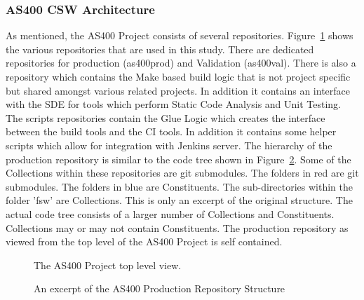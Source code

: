 \documentclass[12pt, a4paper, titlepage]{scrartcl}
\begin{document}
\subsubsection{AS400 CSW Architecture }
As mentioned, the AS400 Project consists of several repositories. Figure~\ref{fig:as400-top-level} shows the various repositories that are used in this study. There are dedicated repositories for production (as400prod) and Validation (as400val). There is also a repository which contains the Make based build logic that is not project specific but shared amongst various related projects. In addition it contains an interface with the SDE for tools which perform Static Code Analysis and Unit Testing. The scripts repositories contain the Glue Logic which creates the interface between the build tools and the CI tools. In addition it contains some helper scripts which allow for integration with Jenkins server. The hierarchy of the production repository is similar to the code tree shown in Figure~\ref{fig:prod-repo-structure}. Some of the Collections within these repositories are git submodules\cite{chacon2011git}. The folders in red are git submodules. The folders in blue are Constituents. The sub-directories within the folder 'fsw' are Collections. This is only an excerpt of the original structure. The actual code tree consists of a larger number of Collections and Constituents. Collections may or may not contain Constituents. The production repository as viewed from the top level of the AS400 Project is self contained.  

\begin{figure}[h]
\noindent{}
\caption{The AS400 Project top level view.}
\label{fig:as400-top-level}
\end{figure}
\begin{figure}
\noindent{}
\caption{An excerpt of the AS400 Production Repository Structure}
\label{fig:prod-repo-structure}
\end{figure}
\end{document}
